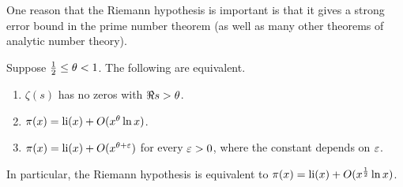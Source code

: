 One reason that the Riemann hypothesis is important is that it gives a strong error bound in the prime number theorem (as well as many other theorems of analytic number theory).
\begin{thm}
Suppose $\frac{1}{2}\le \theta<1$. The following are equivalent.
\begin{enumerate}
\item
$\zeta(s)$ has no zeros with $\Re s>\theta$.
\item
$\pi(x)=\operatorname{li}(x)+O(x^{\theta}\ln x)$.
\item
$\pi(x)=\operatorname{li}(x)+O(x^{\theta+\varepsilon})$ for every $\varepsilon>0$, where the constant depends on $\varepsilon$.
\end{enumerate}
In particular, the Riemann hypothesis is equivalent to $\pi(x)=\operatorname{li}(x)+O(x^{\frac{1}{2}}\ln x)$.
\end{thm}
